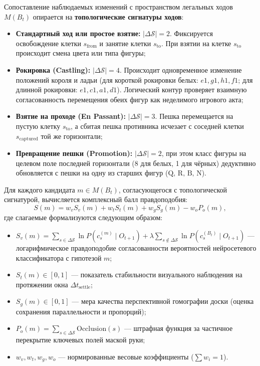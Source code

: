Сопоставление наблюдаемых изменений с пространством легальных ходов $M(B_t)$ опирается на \textbf{топологические сигнатуры ходов}:
\begin{itemize}
    \item \textbf{Стандартный ход или простое взятие:} $|\Delta \mathcal{S}| = 2$. Фиксируется освобождение клетки $s_{\text{from}}$ и занятие клетки $s_{\text{to}}$. При взятии на клетке $s_{\text{to}}$ происходит смена цвета или типа фигуры;
    \item \textbf{Рокировка (Castling):} $|\Delta \mathcal{S}| = 4$. Происходит одновременное изменение положений короля и ладьи (для короткой рокировки белых: $e1, g1, h1, f1$; для длинной рокировки: $e1, c1, a1, d1$). Логический контур проверяет взаимную согласованность перемещения обеих фигур как неделимого игрового акта;
    \item \textbf{Взятие на проходе (En Passant):} $|\Delta \mathcal{S}| = 3$. Пешка перемещается на пустую клетку $s_{\text{to}}$, а сбитая пешка противника исчезает с соседней клетки $s_{\text{captured}}$ той же горизонтали;
    \item \textbf{Превращение пешки (Promotion):} $|\Delta \mathcal{S}| = 2$, при этом класс фигуры на целевом поле последней горизонтали (8 для белых, 1 для чёрных) дедуктивно обновляется с пешки на одну из старших фигур ($\text{Q, R, B, N}$).
\end{itemize}

Для каждого кандидата $m \in M(B_t)$, согласующегося с топологической сигнатурой, вычисляется комплексный балл правдоподобия:
\[
S(m) = w_v S_v(m) + w_t S_t(m) + w_g S_g(m) - w_o P_o(m),
\]
где слагаемые формализуются следующим образом:
\begin{itemize}
    \item $S_v(m) = \sum_{s \in \Delta \mathcal{S}} \ln P(c_s^{(m)} \mid O_{t+1}) + \lambda \sum_{s \notin \Delta \mathcal{S}} \ln P(c_s^{(B_t)} \mid O_{t+1})$ --- логарифмическое правдоподобие согласованности вероятностей нейросетевого классификатора с гипотезой $m$;
    \item $S_t(m) \in [0, 1]$ --- показатель стабильности визуального наблюдения на протяжении окна $\Delta t_{\text{settle}}$;
    \item $S_g(m) \in [0, 1]$ --- мера качества перспективной гомографии доски (оценка сохранения параллельности и пропорций);
    \item $P_o(m) = \sum_{s \in \Delta \mathcal{S}} \text{Occlusion}(s)$ --- штрафная функция за частичное перекрытие ключевых полей маской руки;
    \item $w_v, w_t, w_g, w_o$ --- нормированные весовые коэффициенты ($\sum w_i = 1$).
\end{itemize}

